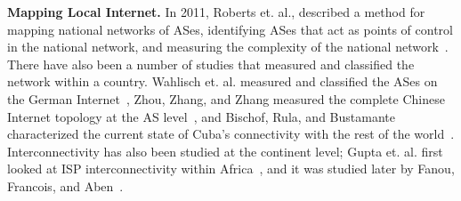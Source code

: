 {\bf Mapping Local Internet.}  In 2011, Roberts et. al., described a method for mapping national networks of ASes, identifying ASes that act as points of control in the national network, and measuring the complexity of the national network~\cite{roberts2011mapping}.  There have also been a number of studies that measured and classified the network within a country.  Wahlisch et. al. measured and classified the ASes on the German Internet~\cite{wahlisch2010framework, wahlisch2012exposing}, Zhou, Zhang, and Zhang measured the complete Chinese Internet topology at the AS level~\cite{zhou2007chinese}, and Bischof, Rula, and Bustamante characterized the current state of Cuba's connectivity with the rest of the world~\cite{bischof2015and}.  Interconnectivity has also been studied at the continent level; Gupta et. al. first looked at ISP interconnectivity within Africa~\cite{gupta2014peering}, and it was studied later by Fanou, Francois, and Aben~\cite{fanou2015diversity}.
